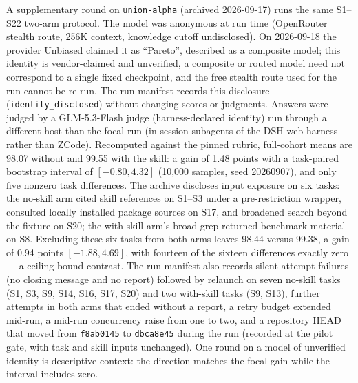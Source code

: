 \documentclass[11pt]{article}
\begin{document}
A supplementary round on \texttt{union-alpha} (archived 2026-09-17) runs the same S1--S22 two-arm protocol. The model was anonymous at run time (OpenRouter stealth route, 256K context, knowledge cutoff undisclosed). On 2026-09-18 the provider Unbiased claimed it as ``Pareto'', described as a composite model; this identity is vendor-claimed and unverified, a composite or routed model need not correspond to a single fixed checkpoint, and the free stealth route used for the run cannot be re-run. The run manifest records this disclosure (\texttt{identity\_disclosed}) without changing scores or judgments. Answers were judged by a GLM-5.3-Flash judge (harness-declared identity) run through a different host than the focal run (in-session subagents of the DSH web harness rather than ZCode). Recomputed against the pinned rubric, full-cohort means are 98.07 without and 99.55 with the skill: a gain of 1.48 points with a task-paired bootstrap interval of $[-0.80, 4.32]$ (10{,}000 samples, seed 20260907), and only five nonzero task differences. The archive discloses input exposure on six tasks: the no-skill arm cited skill references on S1--S3 under a pre-restriction wrapper, consulted locally installed package sources on S17, and broadened search beyond the fixture on S20; the with-skill arm's broad grep returned benchmark material on S8. Excluding these six tasks from both arms leaves 98.44 versus 99.38, a gain of 0.94 points $[-1.88, 4.69]$, with fourteen of the sixteen differences exactly zero --- a ceiling-bound contrast. The run manifest also records silent attempt failures (no closing message and no report) followed by relaunch on seven no-skill tasks (S1, S3, S9, S14, S16, S17, S20) and two with-skill tasks (S9, S13), further attempts in both arms that ended without a report, a retry budget extended mid-run, a mid-run concurrency raise from one to two, and a repository HEAD that moved from \texttt{f8ab0145} to \texttt{dbca8e45} during the run (recorded at the pilot gate, with task and skill inputs unchanged). One round on a model of unverified identity is descriptive context: the direction matches the focal gain while the interval includes zero.
\end{document}

